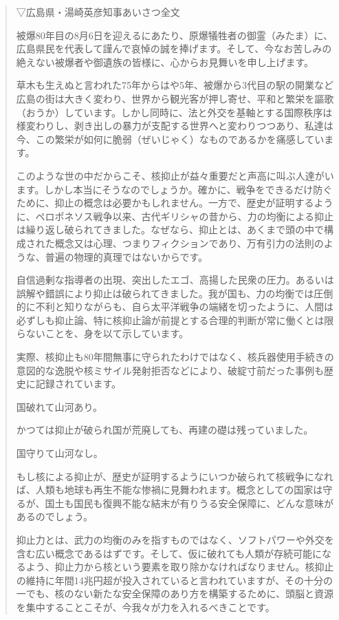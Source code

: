 \begin{quote}
▽広島県・湯崎英彦知事あいさつ全文

被爆80年目の8月6日を迎えるにあたり、原爆犠牲者の御霊（みたま）に、広島県民を代表して謹んで哀悼の誠を捧げます。そして、今なお苦しみの絶えない被爆者や御遺族の皆様に、心からお見舞いを申し上げます。

草木も生えぬと言われた75年からはや5年、被爆から3代目の駅の開業など広島の街は大きく変わり、世界から観光客が押し寄せ、平和と繁栄を謳歌（おうか）しています。しかし同時に、法と外交を基軸とする国際秩序は様変わりし、剥き出しの暴力が支配する世界へと変わりつつあり、私達は今、この繁栄が如何に脆弱（ぜいじゃく）なものであるかを痛感しています。

このような世の中だからこそ、核抑止が益々重要だと声高に叫ぶ人達がいます。しかし本当にそうなのでしょうか。確かに、戦争をできるだけ防ぐために、抑止の概念は必要かもしれません。一方で、歴史が証明するように、ペロポネソス戦争以来、古代ギリシャの昔から、力の均衡による抑止は繰り返し破られてきました。なぜなら、抑止とは、あくまで頭の中で構成された概念又は心理、つまりフィクションであり、万有引力の法則のような、普遍の物理的真理ではないからです。

自信過剰な指導者の出現、突出したエゴ、高揚した民衆の圧力。あるいは誤解や錯誤により抑止は破られてきました。我が国も、力の均衡では圧倒的に不利と知りながらも、自ら太平洋戦争の端緒を切ったように、人間は必ずしも抑止論、特に核抑止論が前提とする合理的判断が常に働くとは限らないことを、身を以て示しています。

実際、核抑止も80年間無事に守られたわけではなく、核兵器使用手続きの意図的な逸脱や核ミサイル発射拒否などにより、破綻寸前だった事例も歴史に記録されています。

国破れて山河あり。

かつては抑止が破られ国が荒廃しても、再建の礎は残っていました。

国守りて山河なし。

もし核による抑止が、歴史が証明するようにいつか破られて核戦争になれば、人類も地球も再生不能な惨禍に見舞われます。概念としての国家は守るが、国土も国民も復興不能な結末が有りうる安全保障に、どんな意味があるのでしょう。

抑止力とは、武力の均衡のみを指すものではなく、ソフトパワーや外交を含む広い概念であるはずです。そして、仮に破れても人類が存続可能になるよう、抑止力から核という要素を取り除かなければなりません。核抑止の維持に年間14兆円超が投入されていると言われていますが、その十分の一でも、核のない新たな安全保障のあり方を構築するために、頭脳と資源を集中することこそが、今我々が力を入れるべきことです。


\end{quote}
